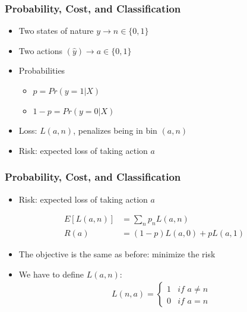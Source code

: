 \documentclass[
  shownotes,
  xcolor={svgnames},
  hyperref={colorlinks,citecolor=DarkBlue,linkcolor=DarkRed,urlcolor=DarkBlue}
  , aspectratio=169]{beamer}
\begin{document}
\begin{frame}[fragile]
\frametitle{Probability, Cost, and Classification}

\begin{itemize}
  \item Two states of nature $y \rightarrow n\in\{0,1\}$
  \medskip
  \item Two actions $(\hat{y}) \rightarrow a\in \{0,1\}$
  \medskip
  \item Probabilities
  \begin{itemize}
    \item $p=Pr(y=1|X)$
    \item $1-p=Pr(y=0|X)$
  \end{itemize}
  \medskip
  \item Loss: $L(a,n)$, penalizes being in bin $(a,n)$
  \item Risk: expected loss of taking action $a$
\end{itemize}


\end{frame}
\begin{frame}[fragile]
\frametitle{Probability, Cost, and Classification}

\begin{itemize}
  \item Risk: expected loss of taking action $a$
\end{itemize}

\begin{align}
E[L(a,n)] &= \sum_n p_n L(a,n) \\ \nonumber
R(a) &= (1-p) L(a,0) + p L(a,1)
\end{align}

\begin{itemize}
  \item The objective is the same as before: minimize the risk
  \item We have to define $L(a,n):$
  \pause
  \begin{align}
  L(n,a)=\begin{cases}
          1 & if\,\, a\neq n\\
          0 & if \,\, a=n
          \end{cases}
  \end{align}
\end{itemize}

\end{frame}
\end{document}
